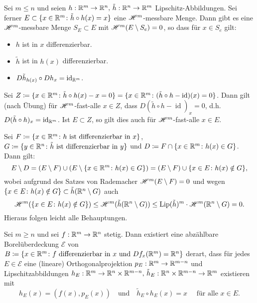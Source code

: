 \documentclass[a4paper,twoside,DIV15,BCOR12mm]{scrbook}
\newcommand{\HM}{\H}
\DeclareMathOperator{\id}{id}
\DeclareMathOperator{\Lip}{Lip}
\begin{document}
\begin{lemma}\label{lem:3.13}
Sei \(m\leq n\) und seien \(h: \mathbb{R}^m\to\mathbb{R}^n,\, \tilde h: \mathbb{R}^n\to\mathbb{R}^m\) Lipschitz-Abbildungen. Sei ferner \(E \subset \{x\in\mathbb{R}^m\colon \tilde h \circ h (x) = x \}\) eine \(\HM^m\)-messbare Menge. Dann gibt es eine \(\HM^m\)-messbare Menge \(S_E \subset E\) mit \(\HM^m(E\setminus S_e) = 0\), so dass für \(x \in S_e\) gilt:
\begin{itemize}
\item \(h\) ist in \(x\) differenzierbar.
\item \(\tilde h\) ist in \(h(x)\) differenzierbar.
\item \(D\tilde h_{h(x)} \circ D  h_x = \id_{\MdR^m}\).
\end{itemize}
\end{lemma}
\begin{beweis}
Sei \(Z \da \{ x\in \MdR^m \colon \tilde h\circ h (x) - x = 0 \} = \{ x\in\MdR^m \colon (\tilde h\circ h-\id)(x) = 0 \}\). Dann gilt (nach Übung) für \(\HM^m\)-fast-alle \(x \in Z\), dass \(D(\tilde h \circ h - \id)_x = 0\), d.h. \(D(\tilde h \circ h)_x = \id_{\MdR^m}\). Ist \(E \subset Z\), so gilt dies auch für \(\HM^m\)-fast-alle \(x\in E\). 

Sei \(F \da \{x\in\MdR^m \colon h \text{ ist differenzierbar in } x\}\), \(G \da \{y\in\MdR^n \colon \tilde h \text{ ist differenzierbar in } y\}\) und \(D \da F \cap \{x\in\MdR^m \colon h(x)\in G\}\). Dann gilt:
\[
E\setminus D = (E\setminus F) \cup (E \setminus \{x\in\mathbb{R}^m \colon h(x) \in G\}) = (E\setminus F) \cup \{x\in E \colon h(x) \notin G\},
\]
wobei aufgrund des Satzes von Rademacher \(\HM^m(E\setminus F) = 0\) und wegen \(\{x\in E \colon h(x) \notin G\} \subset \tilde h(\mathbb{R}^n\setminus G)\) auch 
$$
\HM^m(\{x\in E \colon h(x) \notin G\}) \leq \HM^m(\tilde h(\MdR^n\setminus G)) \leq \Lip(\tilde h)^m \cdot \HM^m(\MdR^n\setminus G) = 0.
$$
Hieraus folgen leicht alle Behauptungen.
\end{beweis}

\begin{lemma}\label{lem:3.14}
Sei \(m\geq n\) und sei \(f: \mathbb{R}^m\to\mathbb{R}^n\) stetig. Dann existiert eine abzählbare Borelüberdeckung \(\mathcal E\) von \(B \da \{x\in\MdR^m \colon f\text{ differenzierbar in } x \text{ und } Df_x(\MdR^m)=\MdR^n\}\) derart, dass für jedes \(E \in \mathcal E\) eine (lineare) Orthogonalprojektion \(p_E: \mathbb{R}^m \to \mathbb{R}^{m-n}\) und Lipschitzabbildungen \(h_E: \mathbb{R}^m \to \mathbb{R}^n \times \mathbb{R}^{m-n},\, \tilde h_E:\mathbb{R}^n\times \mathbb{R}^{m-n} \to \mathbb{R}^m\) existieren mit
\[
h_E(x) = (f(x),p_E(x)) \quad \text{und} \quad \tilde h_E \circ h_E(x) = x \quad \text{ für alle } x\in E.
\]
\end{lemma}
\end{document}
